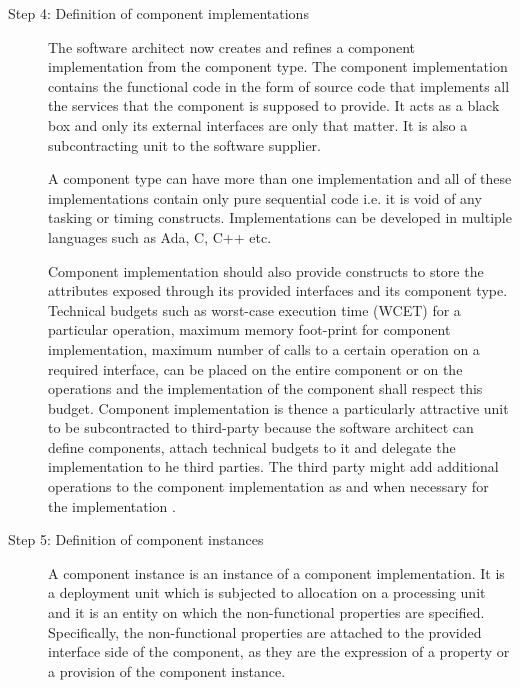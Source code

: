 \begin{description}
\item [Step 4: Definition of component implementations] The software architect now creates and refines a component implementation from the component type. The component implementation contains the functional code in the form of source code that implements all the services that the component is supposed to provide. It acts as a  black box and only its external interfaces are only that matter. It is also a subcontracting unit to the software supplier. 

A component type can have more than one implementation and all of these implementations contain only pure sequential code i.e. it is void of any tasking or timing constructs. Implementations can be developed in multiple languages such as Ada, C, C++ etc.  

Component implementation should also provide constructs to store the attributes exposed through its provided interfaces and its component type. Technical budgets such as worst-case execution time (WCET) for a particular operation, maximum memory foot-print for component implementation, maximum number of calls to a certain operation on a required interface, can be placed on the entire component or on the operations and the implementation of the component shall respect this budget. Component implementation is thence a particularly attractive unit to be subcontracted to third-party because the software architect can define components, attach technical budgets to it and delegate the implementation to he third parties. The third party might add additional operations to the component implementation as and when necessary for the implementation \cite{CompBasedProcess}.  

\item [Step 5: Definition of component instances] A component instance is an instance of a component implementation. It is a deployment unit which is subjected to allocation on a processing unit and it is an entity on which the non-functional properties are specified. Specifically, the non-functional properties are attached to the provided interface side of the component, as they are the expression of a property or a provision of the component instance.


\end{description}
